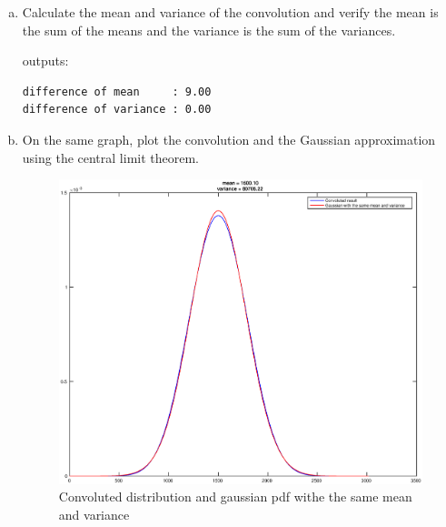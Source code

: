 \begin{enumerate}[(a)]
\item  Calculate the mean and variance of the convolution and verify the mean is the sum of the means and the variance is the sum of the variances.

  outputs:
  \color{lightgray}
\begin{verbatim}
difference of mean     : 9.00
difference of variance : 0.00
\end{verbatim}
  \color{black}

\item  On the same graph, plot the convolution and the Gaussian approximation using the
  central limit theorem.
  \begin{figure}[!h]
    \begin{center}
      \includegraphics[width=6in]{gaussian.eps}
    \end{center}
      \caption{Convoluted distribution and gaussian pdf withe the same mean and variance}
      \label{fig:conv_gauss}
  \end{figure}
\end{enumerate}
\vspace{.5in}


